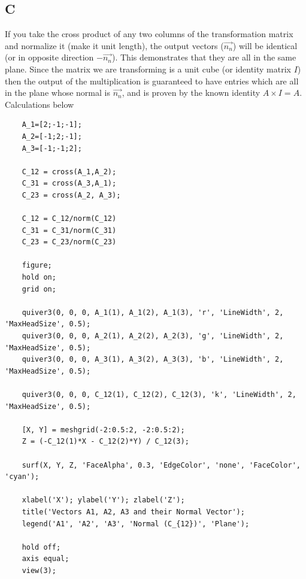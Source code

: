 \documentclass{article}
\begin{document}
\subsection*{C}

If you take the cross product of any two columns of the transformation matrix and normalize it (make it unit length), the output vectors (\(\vec{n_n}\)) will be identical (or in opposite direction \(-\vec{n_n}\)). This demonstrates that they are all in the same plane. Since the matrix we are transforming is a unit cube (or identity matrix \(I\)) then the output of the multiplication is guaranteed to have entries which are all in the plane whose normal is \(\vec{n_n}\), and is proven by the known identity \(A \times I=A\). Calculations below

\begin{verbatim}
	A_1=[2;-1;-1];
	A_2=[-1;2;-1];
	A_3=[-1;-1;2];
	
	C_12 = cross(A_1,A_2);
	C_31 = cross(A_3,A_1);
	C_23 = cross(A_2, A_3);
	
	C_12 = C_12/norm(C_12)
	C_31 = C_31/norm(C_31)
	C_23 = C_23/norm(C_23)
	
	figure;
	hold on;
	grid on;
	
	quiver3(0, 0, 0, A_1(1), A_1(2), A_1(3), 'r', 'LineWidth', 2, 'MaxHeadSize', 0.5);
	quiver3(0, 0, 0, A_2(1), A_2(2), A_2(3), 'g', 'LineWidth', 2, 'MaxHeadSize', 0.5);
	quiver3(0, 0, 0, A_3(1), A_3(2), A_3(3), 'b', 'LineWidth', 2, 'MaxHeadSize', 0.5);
	
	quiver3(0, 0, 0, C_12(1), C_12(2), C_12(3), 'k', 'LineWidth', 2, 'MaxHeadSize', 0.5);
	
	[X, Y] = meshgrid(-2:0.5:2, -2:0.5:2);
	Z = (-C_12(1)*X - C_12(2)*Y) / C_12(3);
	
	surf(X, Y, Z, 'FaceAlpha', 0.3, 'EdgeColor', 'none', 'FaceColor', 'cyan');
	
	xlabel('X'); ylabel('Y'); zlabel('Z');
	title('Vectors A1, A2, A3 and their Normal Vector');
	legend('A1', 'A2', 'A3', 'Normal (C_{12})', 'Plane');
	
	hold off;
	axis equal;
	view(3);
	\end{verbatim}
	
\end{document}
